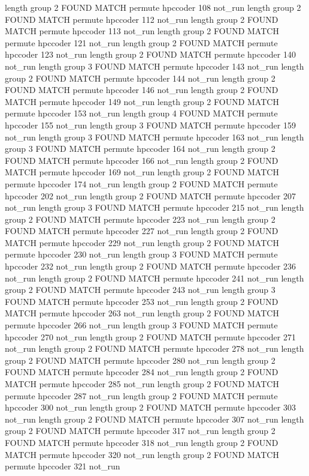 length group  2
FOUND MATCH permute hpccoder 108 not_run
length group  2
FOUND MATCH permute hpccoder 112 not_run
length group  2
FOUND MATCH permute hpccoder 113 not_run
length group  2
FOUND MATCH permute hpccoder 121 not_run
length group  2
FOUND MATCH permute hpccoder 123 not_run
length group  2
FOUND MATCH permute hpccoder 140 not_run
length group  3
FOUND MATCH permute hpccoder 143 not_run
length group  2
FOUND MATCH permute hpccoder 144 not_run
length group  2
FOUND MATCH permute hpccoder 146 not_run
length group  2
FOUND MATCH permute hpccoder 149 not_run
length group  2
FOUND MATCH permute hpccoder 153 not_run
length group  4
FOUND MATCH permute hpccoder 155 not_run
length group  3
FOUND MATCH permute hpccoder 159 not_run
length group  3
FOUND MATCH permute hpccoder 163 not_run
length group  3
FOUND MATCH permute hpccoder 164 not_run
length group  2
FOUND MATCH permute hpccoder 166 not_run
length group  2
FOUND MATCH permute hpccoder 169 not_run
length group  2
FOUND MATCH permute hpccoder 174 not_run
length group  2
FOUND MATCH permute hpccoder 202 not_run
length group  2
FOUND MATCH permute hpccoder 207 not_run
length group  3
FOUND MATCH permute hpccoder 215 not_run
length group  2
FOUND MATCH permute hpccoder 223 not_run
length group  2
FOUND MATCH permute hpccoder 227 not_run
length group  2
FOUND MATCH permute hpccoder 229 not_run
length group  2
FOUND MATCH permute hpccoder 230 not_run
length group  3
FOUND MATCH permute hpccoder 232 not_run
length group  2
FOUND MATCH permute hpccoder 236 not_run
length group  2
FOUND MATCH permute hpccoder 241 not_run
length group  2
FOUND MATCH permute hpccoder 243 not_run
length group  3
FOUND MATCH permute hpccoder 253 not_run
length group  2
FOUND MATCH permute hpccoder 263 not_run
length group  2
FOUND MATCH permute hpccoder 266 not_run
length group  3
FOUND MATCH permute hpccoder 270 not_run
length group  2
FOUND MATCH permute hpccoder 271 not_run
length group  2
FOUND MATCH permute hpccoder 278 not_run
length group  2
FOUND MATCH permute hpccoder 280 not_run
length group  2
FOUND MATCH permute hpccoder 284 not_run
length group  2
FOUND MATCH permute hpccoder 285 not_run
length group  2
FOUND MATCH permute hpccoder 287 not_run
length group  2
FOUND MATCH permute hpccoder 300 not_run
length group  2
FOUND MATCH permute hpccoder 303 not_run
length group  2
FOUND MATCH permute hpccoder 307 not_run
length group  2
FOUND MATCH permute hpccoder 317 not_run
length group  2
FOUND MATCH permute hpccoder 318 not_run
length group  2
FOUND MATCH permute hpccoder 320 not_run
length group  2
FOUND MATCH permute hpccoder 321 not_run
